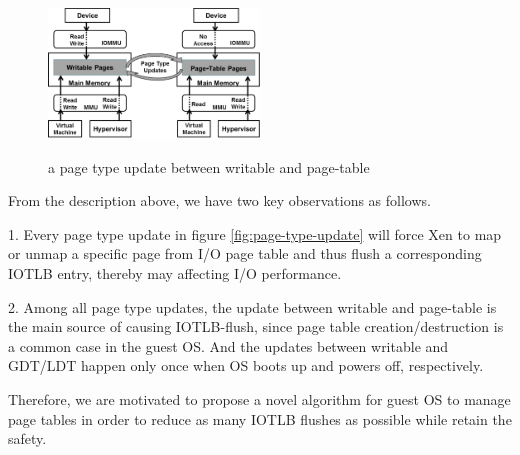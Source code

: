 \begin{figure}[ht]
\centering
\includegraphics[width=0.5\textwidth]{image/background/wr2pt.png} \\
\caption{a page type update between writable and page-table}
\label{fig:wr2pt}
\end{figure}

From the description above, we have two key observations as follows.

1. Every page type update in figure \ref{fig:page-type-update} will force Xen to map or unmap a specific page from I/O page table and thus flush a corresponding IOTLB entry, thereby may affecting I/O performance.

2. Among all page type updates, the update between writable and page-table is the main source of causing IOTLB-flush, since page table creation/destruction is a common case in the guest OS. And the updates between writable and GDT/LDT happen only once when OS boots up and powers off, respectively.

Therefore, we are motivated to propose a novel algorithm for guest OS to manage page tables in order to reduce as many IOTLB flushes as possible while retain the safety.
